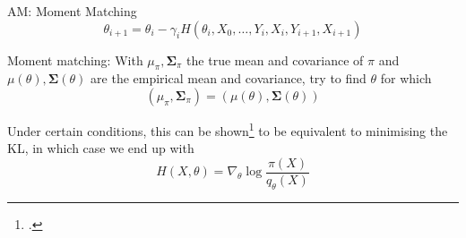 \documentclass[aspectratio=169]{beamer}
\let\oldfootnote\footnote
\renewcommand{\footnote}{\only<+->\oldfootnote}
\begin{document}
\begin{frame}{AM: Moment Matching}
    $$\theta_{i+1} = \theta_i - \gamma_i H(\theta_i, X_0, \ldots, Y_i, X_i, Y_{i+1}, X_{i+1})$$
    
    \pause 

    \alert{Moment matching}: With $\mu_\pi, \bm{\Sigma}_\pi$ the true mean and covariance of $\pi$ and $\mu(\theta), \bm{\Sigma}(\theta)$ are the empirical mean and covariance, try to find $\theta$ for which
        $$(\mu_\pi, \bm{\Sigma}_\pi) = (\mu(\theta), \bm{\Sigma}(\theta))$$
    
    \pause

    Under certain conditions, this can be shown\footcite{andrieu_ergodicity_2006} to be equivalent to minimising the KL, in which case we end up with
        $$H(X, \theta) = \nabla_\theta \log \frac{\pi(X)}{q_\theta(X)}$$ 

    

\end{frame}
\end{document}
